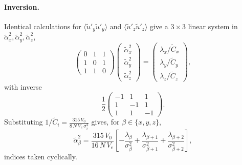 \documentclass[
 amsmath,amssymb,
 aps,
 twocolumn,
]{revtex4-2}
\begin{document}
\paragraph*{Inversion.}
Identical calculations for $\langle\tilde u'_y\tilde u'_y\rangle$ and
$\langle\tilde u'_z\tilde u'_z\rangle$ give a $3\times3$ linear system
in $\tilde\alpha_x^2,\tilde\alpha_y^2,\tilde\alpha_z^2$,
\begin{equation}\label{eq:app_system}
  \begin{pmatrix} 0 & 1 & 1 \\ 1 & 0 & 1 \\ 1 & 1 & 0 \end{pmatrix}
  \begin{pmatrix}\tilde\alpha_x^2\\\tilde\alpha_y^2\\\tilde\alpha_z^2\end{pmatrix}
  =
  \begin{pmatrix}\lambda_x/\tilde C_x\\\lambda_y/\tilde C_y\\\lambda_z/\tilde C_z\end{pmatrix},
\end{equation}
with inverse
\begin{equation}\label{eq:app_inverse}
  \frac{1}{2}\begin{pmatrix}-1 & 1 & 1\\ 1 & -1 & 1\\ 1 & 1 & -1\end{pmatrix}.
\end{equation}
Substituting $1/\tilde C_i = \tfrac{315\,V_0}{8\,N\,V_e\,\sigma_i^2}$
gives, for $\beta\in\{x,y,z\}$,
\begin{equation}\label{eq:app_alphasq}
  \tilde\alpha_\beta^2 = \frac{315\,V_0}{16\,N\,V_e}
  \!\left[-\frac{\lambda_\beta}{\sigma_\beta^2}
        + \frac{\lambda_{\beta+1}}{\sigma_{\beta+1}^2}
        + \frac{\lambda_{\beta+2}}{\sigma_{\beta+2}^2}\right],
\end{equation}
indices taken cyclically.
\end{document}
